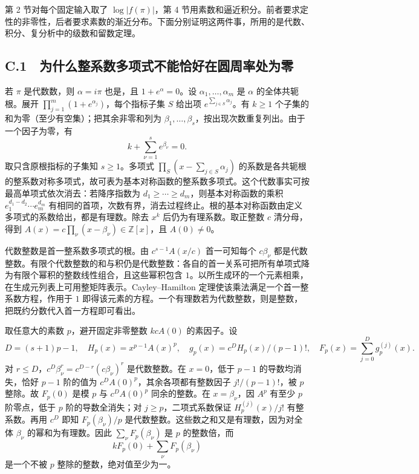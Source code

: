 \documentclass[11pt,a4paper]{article}
\begin{document}
第 2 节对每个固定输入取了 \(\log|f(\pi)|\)，第 4 节用素数和逼近积分。前者要求定性的非零性，后者要求素数的渐近分布。下面分别证明这两件事，所用的是代数、积分、复分析中的级数和留数定理。

\subsection{C.1　为什么整系数多项式不能恰好在圆周率处为零}\label{c.1-ux4e3aux4ec0ux4e48ux6574ux7cfbux6570ux591aux9879ux5f0fux4e0dux80fdux6070ux597dux5728ux5706ux5468ux7387ux5904ux4e3aux96f6}

若 \(\pi\) 是代数数，则 \(\alpha=i\pi\) 也是，且 \(1+e^\alpha=0\)。设 \(\alpha_1,\ldots,\alpha_m\) 是 \(\alpha\) 的全体共轭根。展开 \(\prod_{j=1}^m(1+e^{\alpha_j})\)，每个指标子集 \(S\) 给出项 \(e^{\sum_{j\in S}\alpha_j}\)。有 \(k\ge1\) 个子集的和为零（至少有空集）；把其余非零和列为 \(\beta_1,\ldots,\beta_s\)，按出现次数重复列出。由于一个因子为零，有 \[
 k+\sum_{\nu=1}^s e^{\beta_\nu}=0 .
\] 取只含原根指标的子集知 \(s\ge1\)。多项式 \(\prod_S(x-\sum_{j\in S}\alpha_j)\) 的系数是各共轭根的整系数对称多项式，故可表为基本对称函数的整系数多项式。这个代数事实可按最高单项式依次消去：若降序指数为 \(d_1\ge\cdots\ge d_m\)，则基本对称函数的乘积 \(e_1^{d_1-d_2}\cdots e_m^{d_m}\) 有相同的首项，次数有界，消去过程终止。根的基本对称函数由定义多项式的系数给出，都是有理数。除去 \(x^k\) 后仍为有理系数。取正整数 \(c\) 清分母，得到 \(A(x)=c\prod_\nu(x-\beta_\nu)\in\mathbb Z[x]\)，且 \(A(0)\ne0\)。

代数整数是首一整系数多项式的根。由 \(c^{s-1}A(x/c)\) 首一可知每个 \(c\beta_\nu\) 都是代数整数。有限个代数整数的和与积仍是代数整数：各自的首一关系可把所有单项式降为有限个幂积的整数线性组合，且这些幂积包含 \(1\)。以所生成环的一个元素相乘，在生成元列表上可用整矩阵表示。Cayley--Hamilton 定理使该乘法满足一个首一整系数方程，作用于 \(1\) 即得该元素的方程。一个有理数若为代数整数，则是整数，把既约分数代入首一方程即可看出。

取任意大的素数 \(p\)，避开固定非零整数 \(kcA(0)\) 的素因子。设 \[
 D=(s+1)p-1,\quad H_p(x)=x^{p-1}A(x)^p,\quad
 g_p(x)=c^DH_p(x)/(p-1)!,\quad F_p(x)=\sum_{j=0}^{D}g_p^{(j)}(x).
\] 对 \(r\le D\)，\(c^D\beta_\nu^r=c^{D-r}(c\beta_\nu)^r\) 是代数整数。在 \(x=0\)，低于 \(p-1\) 的导数均消失，恰好 \(p-1\) 阶的值为 \(c^DA(0)^p\)，其余各项都有整数因子 \(j!/(p-1)!\)，被 \(p\) 整除。故 \(F_p(0)\) 是模 \(p\) 与 \(c^DA(0)^p\) 同余的整数。在 \(x=\beta_\nu\)，因 \(A^p\) 有至少 \(p\) 阶零点，低于 \(p\) 阶的导数全消失；对 \(j\ge p\)，二项式系数保证 \(H_p^{(j)}(x)/j!\) 有整系数。再用 \(c^D\) 即知 \(F_p(\beta_\nu)/p\) 是代数整数。这些数之和又是有理数，因为对全体 \(\beta_\nu\) 的幂和为有理数。因此 \(\sum_\nu F_p(\beta_\nu)\) 是 \(p\) 的整数倍，而 \[
 kF_p(0)+\sum_\nu F_p(\beta_\nu)
\] 是一个不被 \(p\) 整除的整数，绝对值至少为一。
\end{document}
